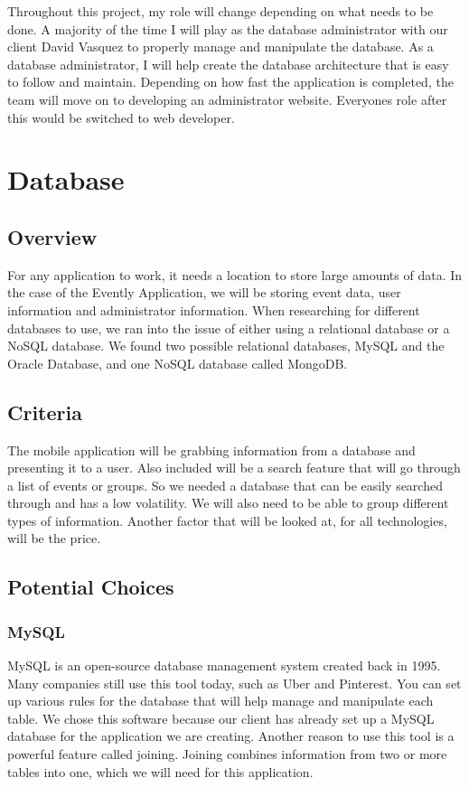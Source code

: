 \documentclass[onecolumn, draftclsnofoot,10pt, compsoc]{IEEEtran}
\begin{document}
Throughout this project, my role will change depending on what needs to be done. A majority of the time I will play as the database administrator with our client David Vasquez to properly manage and manipulate the database. As a database administrator, I will help create the database architecture that is easy to follow and maintain. Depending on how fast the application is completed, the team will move on to developing an administrator website. Everyones role after this would be switched to web developer.

\section{Database}
\subsection{Overview}

For any application to work, it needs a location to store large amounts of data. In the case of the Evently Application, we will be storing event data, user information and administrator information. When researching for different databases to use, we ran into the issue of either using a relational database or a NoSQL database. We found two possible relational databases, MySQL and the Oracle Database, and one NoSQL database called MongoDB.

\subsection{Criteria}

The mobile application will be grabbing information from a database and presenting it to a user. Also included will be a search feature that will go through a list of events or groups. So we needed a database that can be easily searched through and has a low volatility. We will also need to be able to group different types of information. Another factor that will be looked at, for all technologies, will be the price.

\subsection{Potential Choices}
\subsubsection{MySQL}

MySQL is an open-source database management system created back in 1995. Many companies still use this tool today, such as Uber and Pinterest. You can set up various rules for the database that will help manage and manipulate each table. We chose this software because our client has already set up a MySQL database for the application we are creating. Another reason to use this tool is a powerful feature called joining. Joining combines information from two or more tables into one, which we will need for this application.
\end{document}
